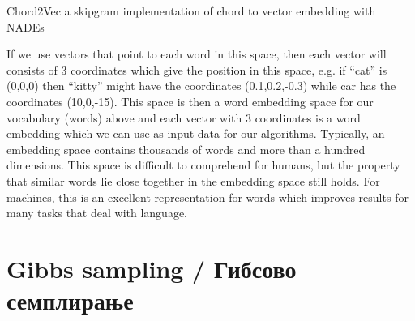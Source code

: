 Chord2Vec a skipgram implementation of chord to vector embedding with NADEs \cite{Madjiheurem2016}

If we use vectors that point to each word in this space, then each vector will consists of 3 coordinates which give the position in this space, e.g. if “cat” is (0,0,0) then “kitty” might have the coordinates (0.1,0.2,-0.3) while car has the coordinates (10,0,-15).
This space is then a word embedding space for our vocabulary (words) above and each vector with 3 coordinates is a word embedding which we can use as input data for our algorithms.
Typically, an embedding space contains thousands of words and more than a hundred dimensions. This space is difficult to comprehend for humans, but the property that similar words lie close together in the embedding space still holds. For machines, this is an excellent representation for words which improves results for many tasks that deal with language.

\section{Gibbs sampling / Гибсово семплирање}

